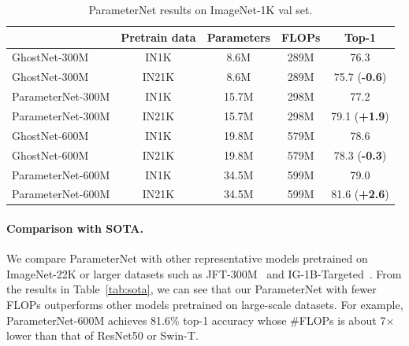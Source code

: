 \documentclass{article}
\begin{document}
\begin{table}[htb]
	\centering
	\renewcommand\arraystretch{1.05}
	\caption{ParameterNet results on ImageNet-1K val set.}
	\label{tab:ghostnet}
	\begin{tabular}{l|c|ccc}
		\hline
		& Pretrain data  & Parameters & FLOPs & Top-1  \\
		\hline
		GhostNet-300M~\cite{ghostnet} & IN1K &  8.6M & 289M & 76.3 \\
		GhostNet-300M~\cite{ghostnet} & IN21K &  8.6M & 289M & 75.7 (\textbf{\color{red}-0.6}) \\
		ParameterNet-300M & IN1K &  15.7M & 298M & 77.2 \\
		ParameterNet-300M & IN21K &  15.7M & 298M & 79.1 (\textbf{\color{green}+1.9}) \\
		\hline
		GhostNet-600M~\cite{ghostnet} & IN1K &  19.8M & 579M & 78.6 \\
		GhostNet-600M~\cite{ghostnet} & IN21K &  19.8M & 579M & 78.3 (\textbf{\color{red}-0.3}) \\
		ParameterNet-600M & IN1K &  34.5M & 599M & 79.0 \\
		ParameterNet-600M & IN21K &  34.5M & 599M & 81.6 (\textbf{\color{green}+2.6}) \\
		\hline
	\end{tabular}	
\end{table}

\paragraph{Comparison with SOTA.}
We compare ParameterNet with other representative models pretrained on ImageNet-22K or larger datasets such as JFT-300M~\cite{sun2017revisiting} and IG-1B-Targeted~\cite{yalniz2019billion}. From the results in Table~\ref{tab:sota}, we can see that our ParameterNet with fewer FLOPs outperforms other models pretrained on large-scale datasets. For example, ParameterNet-600M achieves 81.6\% top-1 accuracy whose \#FLOPs is about 7$\times$ lower than that of ResNet50 or Swin-T.
\end{document}
